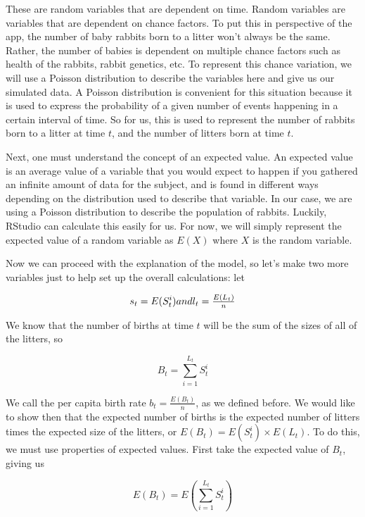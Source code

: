 \documentclass{article}\usepackage[]{graphicx}\usepackage[]{color}
\begin{document}
\noindent These are random variables that are dependent on time. Random variables are variables that are dependent on chance factors. To put this in perspective of the app, the number of baby rabbits born to a litter won't always be the same. Rather, the number of babies is dependent on multiple chance factors such as health of the rabbits, rabbit genetics, etc. To represent this chance variation, we will use a Poisson distribution to describe the variables here and give us our simulated data. A Poisson distribution is convenient for this situation because it is used to express the probability of a given number of events happening in a certain interval of time. So for us, this is used to represent the number of rabbits born to a litter at time \(t\), and the number of litters born at time \(t\). 

Next, one must understand the concept of an expected value. An expected value is an average value of a variable that you would expect to happen if you gathered an infinite amount of data for the subject, and is found in different ways depending on the distribution used to describe that variable. In our case, we are using a Poisson distribution to describe the population of rabbits. Luckily, RStudio can calculate this easily for us. For now, we will simply represent the expected value of a random variable as \(E(X)\) where \(X\) is the random variable. 

Now we can proceed with the explanation of the model, so let's make two more variables just to help set up the overall calculations: let 

\begin{equation}
s_t = E(S_t^i)$$ and $$l_t = \frac{E(L_t)}{n}
\end{equation}

\noindent We know that the number of births at time \(t\) will be the sum of the sizes of all of the litters, so 

\begin{equation}
B_t = \sum_{i=1}^{L_t} S_t^i 
\end{equation}

We call the per capita birth rate \(b_t = \frac{E(B_t)}{n}\), as we defined before. We would like to show then that the expected number of births is the expected number of litters times the expected size of the litters, or \(E(B_t) = E(S_t^i)\times E(L_t)\). To do this, we must use properties of expected values. First take the expected value of \(B_t\), giving us 

\begin{equation}
E(B_t) = E(\sum_{i=1}^{L_t} S_t^i)
\end{equation}
\end{document}
